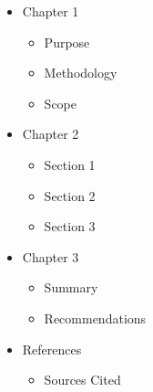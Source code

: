 \begin{itemize}
\item Chapter 1
  \begin{itemize}
  \item Purpose
  \item Methodology
  \item Scope
  \end{itemize}
\item Chapter 2
  \begin{itemize}
  \item Section 1
  \item Section 2
  \item Section 3
  \end{itemize}
\item Chapter 3
  \begin{itemize}
  \item Summary
  \item Recommendations
  \end{itemize}
\item References
  \begin{itemize}
  \item Sources Cited
  \end{itemize}
\end{itemize}

\newpage


